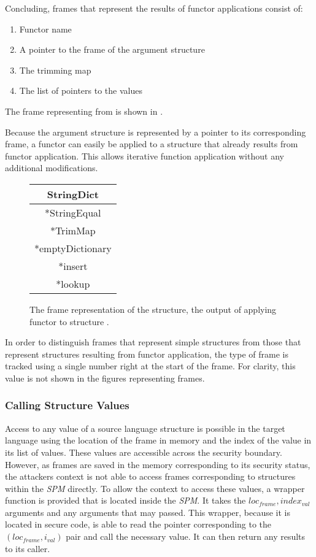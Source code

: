 \documentclass[10pt,a4paper,master=cws, masteroption=ai,english,inputenc=utf8]{kulemt}
\begin{document}
Concluding, frames that represent the results of functor applications consist of:
\begin{enumerate}
\item Functor name
\item A pointer to the frame of the argument structure
\item The trimming map
\item The list of pointers to the values
\end{enumerate}
The frame representing  from  is shown in .

Because the argument structure is represented by a pointer to its corresponding frame, a functor can easily be applied to a structure that already results from functor application.
This allows iterative function application without any additional modifications.

\begin{figure}[htb]
\centering
\begin{tabular}{|c|}
\hline
StringDict \\
\hline
*StringEqual\\
*TrimMap\\
\hline
*emptyDictionary \\
*insert \\ 
*lookup \\
\hline
\end{tabular}
\caption{The frame representation of the  structure, the output of applying functor  to structure .\label{fig:StringDictFrame}}
\end{figure}

In order to distinguish frames that represent simple structures from those that represent structures resulting from functor application, the type of frame is tracked using a single number right at the start of the frame.
For clarity, this value is not shown in the figures representing frames.

\subsubsection{Calling Structure Values}
Access to any value of a source language structure is possible in the target language using the location of the frame in memory and the index of the value in its list of values.
These values are accessible across the security boundary.
However, as frames are saved in the memory corresponding to its security status, the attackers context is not able to access frames corresponding to structures within the \emph{SPM} directly.
To allow the context to access these values, a wrapper function is provided that is located inside the \emph{SPM}. 
It takes the $loc_{frame}, index_{val}$ arguments and any arguments that may passed.
This wrapper, because it is located in secure code, is able to read the pointer corresponding to the $(loc_{frame}, i_{val})$ pair and call the necessary value.
It can then return any results to its caller.
\end{document}

